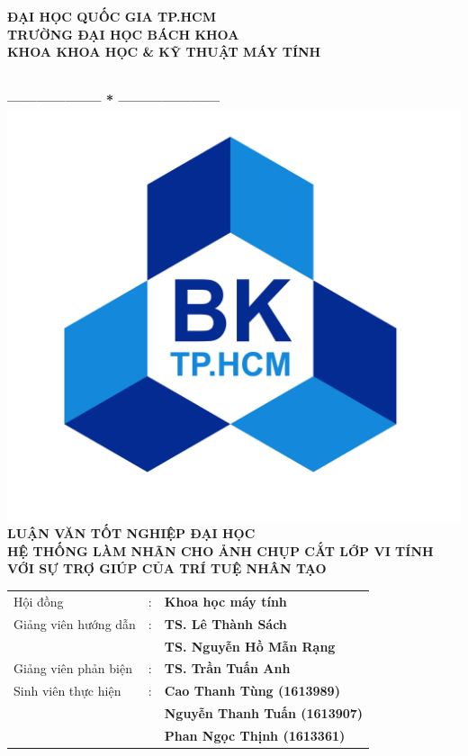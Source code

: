 
\begin{titlepage}
\thispagestyle{empty}
\begin{center}
	\begin{large}
		\textbf{ĐẠI HỌC QUỐC GIA TP.HCM} \\
		\textbf{TRƯỜNG ĐẠI HỌC BÁCH KHOA} \\				
		\textbf{KHOA KHOA HỌC \& KỸ THUẬT MÁY TÍNH}
	\end{large} \\
	\textbf{--------------------  *  ---------------------}\\
	
	\vspace{0.8cm}
	\includegraphics[scale=.35]{images/hcmut.png}\\
	
	\vspace{0.8cm}
	{\fontsize{15pt}{1}\selectfont \textbf{LUẬN VĂN TỐT NGHIỆP ĐẠI HỌC}}\\[.75cm]
	{\fontsize{17pt}{1}\selectfont \textbf{\MakeUppercase{Hệ thống làm nhãn cho ảnh chụp cắt lớp vi tính với sự trợ giúp của Trí tuệ nhân tạo}}}
\end{center}

\vspace{.75cm}
\hspace{1.3cm}
\begin{tabular}{l l l}
	{Hội đồng}              &{:}& \textbf{Khoa học máy tính}\\[.4cm]
	{Giảng viên hướng dẫn}  &{:}& \textbf{TS. Lê Thành Sách}\\[.2cm]
                            &   & \textbf{TS. Nguyễn Hồ Mẫn Rạng}\\[.4cm]
	{Giảng viên phản biện}  &{:}& \textbf{TS. Trần Tuấn Anh}\\[.4cm]
	{Sinh viên thực hiện}   &{:}& \textbf{Cao Thanh Tùng (1613989)}\\[.2cm]
		                    &   & \textbf{Nguyễn Thanh Tuấn (1613907)}\\[.2cm]
		                    &   & \textbf{Phan Ngọc Thịnh (1613361)}
\end{tabular}


\end{titlepage}
